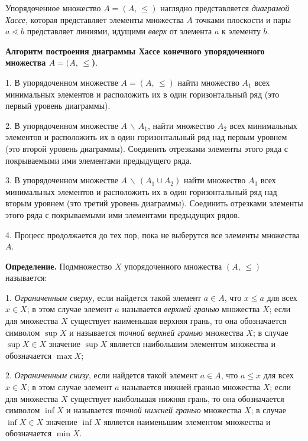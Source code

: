 \documentclass[spec, och, otchet, hidelinks]{SCWorks}
\begin{document}
\newpage

\par Упорядоченное множество $ A = (A,\,\leq) $ наглядно представляется \textit{диаграмой Хассе},
которая представляет элементы множества $ A $ точками плоскости и пары $ a \lessdot  b $
представляет линиями, идущими \textit{вверх} от элемента $ a $ к элементу $ b $.

\par \textbf{Алгоритм построения диаграммы Хассе конечного упорядоченного множества $ A = (A,\,
\leq$)}.

\par 1. В упорядоченном множестве $ A = (A,\,\leq) $ найти множество $ A_1 $ всех минимальных 
элементов и расположить их в один горизонтальный ряд (это первый уровень диаграммы).
\par 2. В упорядоченном множестве $ A \,\backslash \, A_1 $, найти множество $ A_2 $ всех 
минимальных элементов и расположить их в один горизонтальный ряд над первым уровнем (это второй 
уровень диаграммы). Соединить отрезками элементы этого ряда с покрываемыми ими элементами 
предыдущего ряда.
\par 3. В упорядоченном множестве $ A \, \backslash \, (A_1 \cup A_2) $ найти множество $ A_3 $ всех 
минимальных элементов и расположить их в один горизонтальный ряд над вторым уровнем (это третий 
уровень диаграммы). Соединить отрезками элементы этого ряда с покрываемыми ими элементами 
предыдущих рядов.
\par 4. Процесс продолжается до тех пор, пока не выберутся все элементы множества $ A $. \\

\par \textbf{Определение.} Подмножество $ X $ упорядоченного множества $ (A,\,\leq) $ называется:
\par 1. \textit{Ограниченным сверху}, если найдется такой элемент $ a \in A $, что $ x \leq a $
для всех $ x \in X $; в этом случае элемент $ a $ называется \textit{верхней гранью} множества $ X $; 
если для множества $ X $ существует наименьшая верхняя грань, то она обозначается символом
$ \sup X $ и называется \textit{точной верхней гранью} множества $ X $; в случае $ \sup X \in X $
значение $ \sup X $ является наибольшим элементом множества и обозначается $ \max X $;

\par 2. \textit{Ограниченным снизу}, если найдется такой элемент $ a \in A $, что $ a \leq x $ для 
всех $ x \in X $; в этом случае элемент $ a $ называется нижней гранью множества $ X $; если для 
множества $ X $ существует наибольшая нижняя грань, то она обозначается символом
$ \inf X $ и называется \textit{точной нижней гранью} множества $ X $; в случае $ \inf X \in X $
значение $ \inf X $ является наименьшим элементом множества и обозначается $ \min X $. \\
\end{document}
